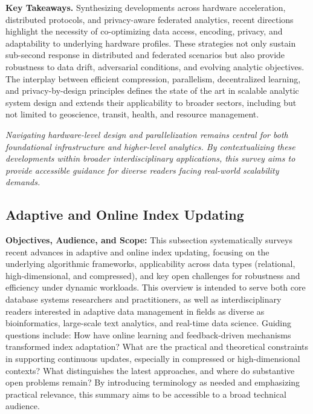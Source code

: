 \documentclass[sigconf]{acmart}
\begin{document}
\textbf{Key Takeaways.} Synthesizing developments across hardware acceleration, distributed protocols, and privacy-aware federated analytics, recent directions highlight the necessity of co-optimizing data access, encoding, privacy, and adaptability to underlying hardware profiles. These strategies not only sustain sub-second response in distributed and federated scenarios but also provide robustness to data drift, adversarial conditions, and evolving analytic objectives. The interplay between efficient compression, parallelism, decentralized learning, and privacy-by-design principles defines the state of the art in scalable analytic system design and extends their applicability to broader sectors, including but not limited to geoscience, transit, health, and resource management. 

\noindent \textit{Navigating hardware-level design and parallelization remains central for both foundational infrastructure and higher-level analytics. By contextualizing these developments within broader interdisciplinary applications, this survey aims to provide accessible guidance for diverse readers facing real-world scalability demands.}


\subsection{Adaptive and Online Index Updating}

\textbf{Objectives, Audience, and Scope:} This subsection systematically surveys recent advances in adaptive and online index updating, focusing on the underlying algorithmic frameworks, applicability across data types (relational, high-dimensional, and compressed), and key open challenges for robustness and efficiency under dynamic workloads. This overview is intended to serve both core database systems researchers and practitioners, as well as interdisciplinary readers interested in adaptive data management in fields as diverse as bioinformatics, large-scale text analytics, and real-time data science. Guiding questions include: How have online learning and feedback-driven mechanisms transformed index adaptation? What are the practical and theoretical constraints in supporting continuous updates, especially in compressed or high-dimensional contexts? What distinguishes the latest approaches, and where do substantive open problems remain? By introducing terminology as needed and emphasizing practical relevance, this summary aims to be accessible to a broad technical audience.
\end{document}
